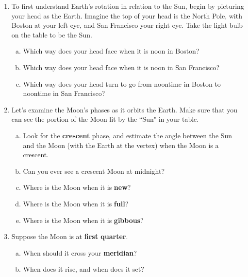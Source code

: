 \documentclass[main.tex]{subfiles}
\begin{document}
\begin{enumerate}
\item To first understand Earth's rotation in relation to the Sun, begin by picturing your head as the Earth. Imagine the top of your head is the North Pole, with Boston at your left eye, and San Francisco your right eye. Take the light bulb on the table to be the Sun.
	\begin{enumerate}[a.]
	\item Which way does your head face when it is noon in Boston?
	\item Which way does your head face when it is noon in San Francisco?
	\item Which way does your head turn to go from noontime in Boston to noontime in San Francisco?
	\end{enumerate}

\item Let's examine the Moon's phases as it orbits the Earth. Make sure that you can see the portion of the Moon lit by the ``Sun" in your table.
	\begin{enumerate}[a.]
	\item Look for the \textbf{crescent} phase, and estimate the angle between the Sun and the Moon (with the Earth at the vertex) when the Moon is a crescent.
	\item Can you ever see a crescent Moon at midnight?
	\item Where is the Moon when it is \textbf{new}?
	\item Where is the Moon when it is \textbf{full}?
	\item Where is the Moon when it is \textbf{gibbous}?
	\end{enumerate}

\item Suppose the Moon is at \textbf{first quarter}.
	\begin{enumerate}[a.]
	\item When should it cross your \textbf{meridian}?
	\item When does it rise, and when does it set?
	\end{enumerate}

\end{enumerate}
\end{document}
